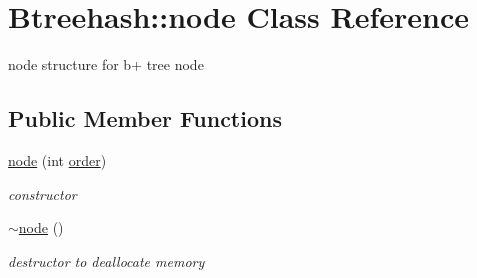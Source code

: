 \hypertarget{class_btreehash_1_1node}{\section{Btreehash\-:\-:node Class Reference}
\label{class_btreehash_1_1node}
}


node structure for b+ tree node  


\subsection*{Public Member Functions}
\begin{DoxyCompactItemize}
\item 
\hyperlink{class_btreehash_1_1node_a5ab060dfba599294dc217c17b7b2635f}{node} (int \hyperlink{class_btreehash_1_1node_a6222a2bd19f802090d25f8ce8e5ea413}{order})
\begin{DoxyCompactList}\small\item\em constructor \end{DoxyCompactList}\item 
\hyperlink{class_btreehash_1_1node_a992fe7e5e4d9acb4f5aea38ed786da8d}{$\sim$node} ()
\begin{DoxyCompactList}\small\item\em destructor to deallocate memory \end{DoxyCompactList}\end{DoxyCompactItemize}
